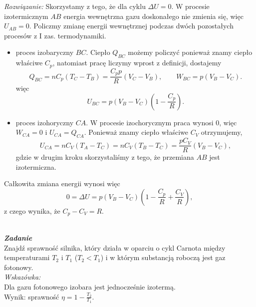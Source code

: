 \documentclass[11pt,a4paper]{article}
\newcounter{zadanie}\newcommand{\zadanie}[1][]{\addtocounter{zadanie}{1} ~\\  {\bf \emph{Zadanie \arabic{zadanie} #1 }} \\}
\begin{document}
{\em Rozwiązanie:}
Skorzystamy z tego, że dla cyklu $\Delta U = 0$. W procesie izotermicznym $AB$ energia wewnętrzna gazu doskonałego nie zmienia się, więc $U_{AB} = 0$. Policzmy zmianę energii wewnętrznej podczas dwóch pozostałych procesów z I zas. termodynamiki.
\begin{itemize}
	\item proces izobaryczny $BC$. Ciepło $Q_{BC}$ możemy policzyć ponieważ znamy ciepło właściwe $C_p$, natomiast pracę liczymy wprost z definicji, dostajemy
	\begin{equation}
	Q_{BC} = n C_p (T_C - T_B) = \frac{C_p p }{R}(V_C - V_B), \qquad W_{BC} =  p (V_B - V_C).
	\end{equation}
	więc
	\begin{equation}
		U_{BC} = p (V_B - V_C) \left(1 - \frac{C_p}{R} \right).
	\end{equation}
	\item proces izohoryczny $CA$. W procesie izochorycznym praca wynosi $0$, więc $W_{CA} = 0$ i $U_{CA} = Q_{CA}$. Ponieważ znamy ciepło właściwe $C_V$ otrzymujemy,
	\begin{equation}
		U_{CA} = n C_V (T_A - T_C) = n C_V (T_B - T_C) = \frac{p C_V}{R}(V_B - V_C),
	\end{equation}
	gdzie w drugim kroku skorzystaliśmy z tego, że przemiana $AB$ jest izotermiczna.
\end{itemize}
Całkowita zmiana energii wynosi więc
\begin{equation}
	0 = \Delta U = p (V_B - V_C) \left(1 - \frac{C_p}{R} + \frac{C_V}{R} \right),
\end{equation}
z czego wynika, że $C_p - C_V = R$.

\newpage

\zadanie
Znajdź sprawność silnika, który działa w oparciu o cykl Carnota między temperaturami 
$T_2$ i $T_1$ ($T_2<T_1$) i w którym substancją roboczą jest gaz fotonowy.\\
{\em Wskazówka:}\\
Dla gazu fotonowego izobara jest jednocześnie izotermą. \\
Wynik: sprawność $\eta=1-\frac{T_2}{T_1}$.
\end{document}

